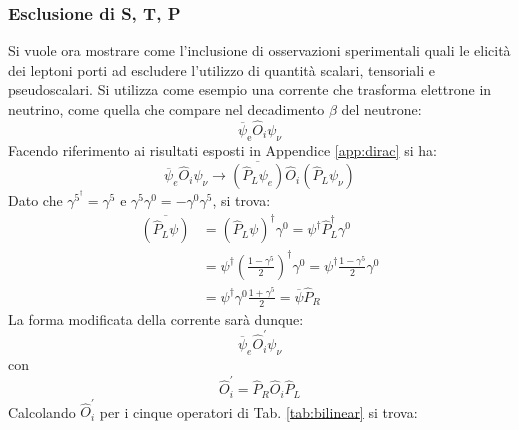 \documentclass{subnucbo}
\begin{document}
\subsubsection{Esclusione di S, T, P}
Si vuole ora mostrare come l'inclusione di osservazioni sperimentali quali le elicità dei leptoni porti ad escludere l'utilizzo di quantità scalari, tensoriali e pseudoscalari. Si utilizza come esempio una corrente che trasforma elettrone in neutrino, come quella che compare nel decadimento $\beta$ del neutrone:
\begin{equation}
        \overline { \psi } _ { \mathrm { e } } \hat { O } _ { i } \psi _ { \nu }
        \label{eq:e_nu_current}
\end{equation}
Facendo riferimento ai risultati esposti in Appendice \ref{app:dirac} si ha:
\begin{equation}
        \overline { \psi} _ {e} \hat { O } _ { i } \psi _ { \nu } \rightarrow \overline { \left( \hat { P } _ { L }  \psi_ {e} \right) } \hat { O } _ { i } \left( \hat { P } _ { L } \psi _ { \nu } \right)
\end{equation}
Dato che $\gamma ^ { 5 } ^ { \dagger } = \gamma ^ { 5 }$ e $\gamma ^ { 5 } \gamma ^ { 0 } = - \gamma ^ { 0 } \gamma ^{ 5 }$, si trova:
\begin{equation}
        \begin{aligned}
                \overline {\left( \hat { P } _ { L } \psi \right)} & = \left( \hat { P } _ { L }  \psi \right) ^ { \dagger } \gamma ^ { 0 } = \psi ^ { \dagger } \hat { P } _ { L } ^ { \dagger } \gamma ^ { 0 } \\ & = \psi ^ { \dagger } \left( \frac { 1 - \gamma ^ { 5 } } { 2 } \right) ^ { \dagger } \gamma ^ { 0 } = \psi ^ { \dagger } \frac { 1 - \gamma ^ { 5 } } { 2 } \gamma ^ { 0 } \\ & = \psi ^ { \dagger } \gamma ^ { 0 } \frac { 1 + \gamma ^ { 5 } } { 2 } = \overline { \psi } \hat { P } _ { R }
        \end{aligned}
\end{equation}
La forma modificata della corrente sarà dunque:
\begin{equation}
        \overline { \psi } _ {e} \hat { O } _ { i } ^ { \prime } \psi _ { \nu }
\end{equation}
con
\begin{equation}
        \hat { O } _ { i } ^ { \prime } = \hat { P } _ { R } \hat { O } _ { i } \hat { P } _ { L }
\end{equation}
Calcolando $\hat { O } _ { i } ^ { \prime }$ per i cinque operatori di Tab. \ref{tab:bilinear} si trova:
\end{document}
